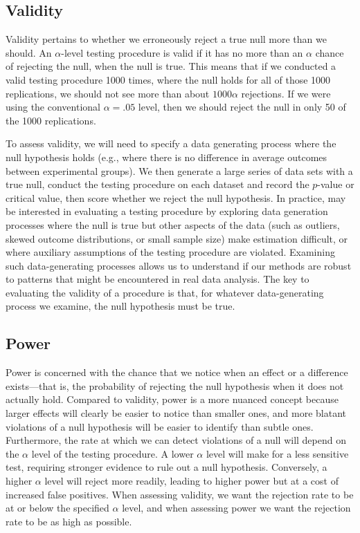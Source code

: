 \documentclass[
]{book}
\begin{document}
\subsection{Validity}\label{validity}

Validity pertains to whether we erroneously reject a true null more than we should.
An \(\alpha\)-level testing procedure is valid if it has no more than an \(\alpha\) chance of rejecting the null, when the null is true.
This means that if we conducted a valid testing procedure 1000 times, where the null holds for all of those 1000 replications, we should not see more than about \(1000 \alpha\) rejections. If we were using the conventional \(\alpha = .05\) level, then we should reject the null in only 50 of the 1000 replications.

To assess validity, we will need to specify a data generating process where the null hypothesis holds (e.g., where there is no difference in average outcomes between experimental groups).
We then generate a large series of data sets with a true null, conduct the testing procedure on each dataset and record the \(p\)-value or critical value, then score whether we reject the null hypothesis.
In practice, may be interested in evaluating a testing procedure by exploring data generation processes where the null is true but other aspects of the data (such as outliers, skewed outcome distributions, or small sample size) make estimation difficult, or where auxiliary assumptions of the testing procedure are violated.
Examining such data-generating processes allows us to understand if our methods are robust to patterns that might be encountered in real data analysis.
The key to evaluating the validity of a procedure is that, for whatever data-generating process we examine, the null hypothesis must be true.

\subsection{Power}\label{power}

Power is concerned with the chance that we notice when an effect or a difference exists---that is, the probability of rejecting the null hypothesis when it does not actually hold.
Compared to validity, power is a more nuanced concept because larger effects will clearly be easier to notice than smaller ones, and more blatant violations of a null hypothesis will be easier to identify than subtle ones.
Furthermore, the rate at which we can detect violations of a null will depend on the \(\alpha\) level of the testing procedure. A lower \(\alpha\) level will make for a less sensitive test, requiring stronger evidence to rule out a null hypothesis.
Conversely, a higher \(\alpha\) level will reject more readily, leading to higher power but at a cost of increased false positives.
When assessing validity, we want the rejection rate to be at or below the specified \(\alpha\) level, and when assessing power we want the rejection rate to be as high as possible.
\end{document}

